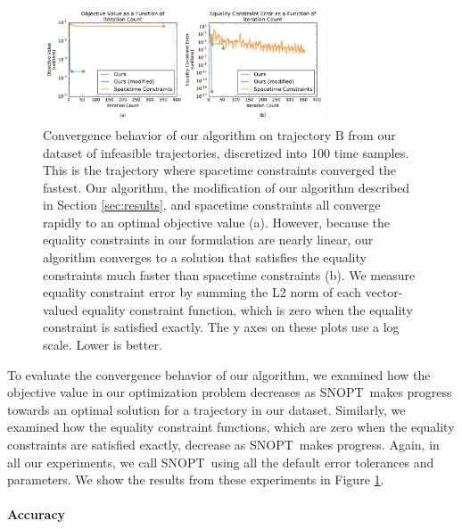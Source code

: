 \begin{figure}[t!]
\centering
\includegraphics[width=3.3in]{images/2016_siggraph/01_convergence.pdf}
\caption{
Convergence behavior of our algorithm on trajectory \textsc{B} from our dataset of infeasible trajectories, discretized into 100 time samples.
This is the trajectory where spacetime constraints converged the fastest.
Our algorithm, the modification of our algorithm described in Section \ref{sec:results}, and spacetime constraints all converge rapidly to an optimal objective value (a).
However, because the equality constraints in our formulation are nearly linear, our algorithm converges to a solution that satisfies the equality constraints much faster than spacetime constraints (b).
We measure equality constraint error by summing the L2 norm of each vector-valued equality constraint function, which is zero when the equality constraint is satisfied exactly. 
The y axes on these plots use a log scale.
Lower is better.
}
\label{fig:convergence}
\end{figure}

To evaluate the convergence behavior of our algorithm, we examined how the objective value in our optimization problem decreases as SNOPT\ makes progress towards an optimal solution for a trajectory in our dataset.
Similarly, we examined how the equality constraint functions, which are zero when the equality constraints are satisfied exactly, decrease as SNOPT\ makes progress.
Again, in all our experiments, we call SNOPT\ using all the default error tolerances and parameters.
We show the results from these experiments in Figure \ref{fig:convergence}.

\paragraph{Accuracy}

